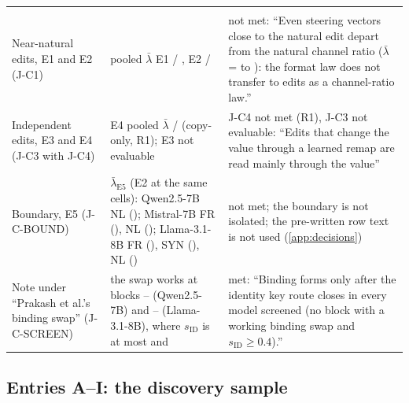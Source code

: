 \begin{table}[p]
\begin{tabular}{@{}p{}p{}p{}@{}}
\addlinespace[2pt]
\multicolumn{3}{@{}l}{\textit{Interventions}} \\
Near-natural edits, E1 and E2 (J-C1) & pooled $\bar\lambda$ E1 \JcOnePoolEoneQwenSeven{} / \JcOnePoolEoneMistralSeven{}, E2 \JcOnePoolEtwoQwenSeven{} / \JcOnePoolEtwoMistralSeven{} & not met: ``Even steering vectors close to the natural edit depart from the natural channel ratio ($\bar\lambda$ = \JcOnePoolEoneMistralSeven{} to \JcOnePoolEtwoMistralSeven{}): the format law does not transfer to edits as a channel-ratio law.'' \\
Independent edits, E3 and E4 (J-C3 with J-C4) & E4 pooled $\bar\lambda$ \JcFourPoolEfourQwenSeven{} / \JcFourPoolEfourMistralSeven{} (copy-only, R1); E3 not evaluable & J-C4 not met (R1), J-C3 not evaluable: ``Edits that change the value through a learned remap are read mainly through the value'' \\
Boundary, E5 (J-C-BOUND) & $\bar\lambda_{\mathrm{E5}}$ (E2 at the same cells): Qwen2.5-7B NL \JcBoundNlQwenSeven{} (\JcBoundEtwoNlQwenSeven{}); Mistral-7B FR \JcBoundFrMistralSeven{} (\JcBoundEtwoFrMistralSeven{}), NL \JcBoundNlMistralSeven{} (\JcBoundEtwoNlMistralSeven{}); Llama-3.1-8B FR \JcBoundFrLlamaEight{} (\JcBoundEtwoFrLlamaEight{}), SYN \JcBoundSynLlamaEight{} (\JcBoundEtwoSynLlamaEight{}), NL \JcBoundNlLlamaEight{} (\JcBoundEtwoNlLlamaEight{}) & not met; the boundary is not isolated; the pre-written row text is not used (\cref{app:decisions}) \\
Note under ``Prakash et al.'s binding swap'' (J-C-SCREEN) & the swap works at blocks \JcScreenWbFirstQwenSeven{}--\JcScreenWbLastQwenSeven{} (Qwen2.5-7B) and \JcScreenWbFirstLlamaEight{}--\JcScreenWbLastLlamaEight{} (Llama-3.1-8B), where $s_{\mathrm{ID}}$ is at most \JcScreenSidWbMaxQwenSeven{} and \JcScreenSidWbMaxLlamaEight{} & met: ``Binding forms only after the identity key route closes in every model screened (no block with a working binding swap and $s_{\mathrm{ID}} \geq 0.4$).'' \\
\bottomrule
\end{tabular}
\end{table}

\subsection{Entries A--I: the discovery sample}\label{app:prereg-ai}\label{sec:failed}

